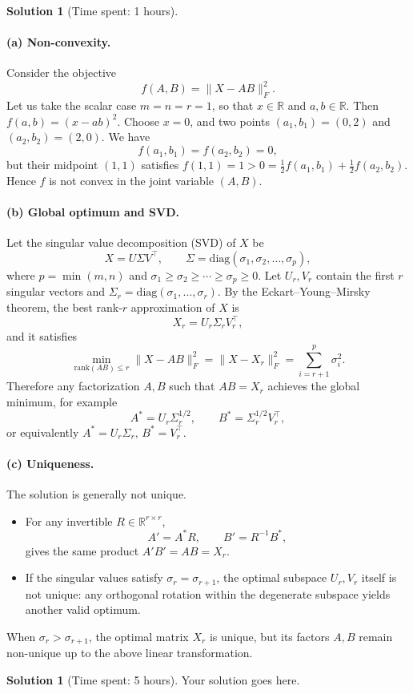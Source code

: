 \documentclass[11pt, reqno, letterpaper, twoside]{amsart}
\theoremstyle{plain}
\theoremstyle{definition}
\newtheorem{solution}[theorem]{Solution}
\begin{document}
\clearpage

\begin{solution}[Time spent: 1 hours]
\paragraph{(a) Non-convexity.}
Consider the objective
\[
f(A,B) = \|X - AB\|_F^2.
\]
Let us take the scalar case \(m = n = r = 1\), so that \(x \in \mathbb{R}\) and \(a,b \in \mathbb{R}\).
Then \(f(a,b) = (x - ab)^2.\)
Choose \(x = 0\), and two points \((a_1,b_1)=(0,2)\) and \((a_2,b_2)=(2,0)\).
We have
\[
f(a_1,b_1)=f(a_2,b_2)=0,
\]
but their midpoint \((1,1)\) satisfies \(f(1,1)=1 > 0 = \tfrac12 f(a_1,b_1) + \tfrac12 f(a_2,b_2)\).
Hence \(f\) is not convex in the joint variable \((A,B)\).

\paragraph{(b) Global optimum and SVD.}
Let the singular value decomposition (SVD) of \(X\) be
\[
X = U \Sigma V^\top, \qquad \Sigma = \mathrm{diag}(\sigma_1, \sigma_2, \ldots, \sigma_p),
\]
where \(p = \min(m,n)\) and \(\sigma_1 \ge \sigma_2 \ge \cdots \ge \sigma_p \ge 0.\)
Let \(U_r, V_r\) contain the first \(r\) singular vectors and
\(\Sigma_r = \mathrm{diag}(\sigma_1, \ldots, \sigma_r)\).
By the Eckart--Young--Mirsky theorem, the best rank-\(r\) approximation of \(X\) is
\[
X_r = U_r \Sigma_r V_r^\top,
\]
and it satisfies
\[
\min_{\mathrm{rank}(AB)\le r} \|X - AB\|_F^2
= \|X - X_r\|_F^2
= \sum_{i=r+1}^{p} \sigma_i^2.
\]
Therefore any factorization \(A,B\) such that \(AB = X_r\) achieves the global minimum,
for example
\[
A^{\ast} = U_r \Sigma_r^{1/2}, \qquad B^{\ast} = \Sigma_r^{1/2} V_r^\top,
\]
or equivalently \(A^{\ast} = U_r \Sigma_r, \, B^{\ast} = V_r^\top.\)

\paragraph{(c) Uniqueness.}
The solution is generally not unique.
\begin{itemize}
  \item For any invertible \(R \in \mathbb{R}^{r\times r}\),
  \[
  A' = A^{\ast} R, \qquad B' = R^{-1} B^{\ast},
  \]
  gives the same product \(A'B' = AB = X_r.\)
  \item If the singular values satisfy \(\sigma_r = \sigma_{r+1}\),
  the optimal subspace \(U_r,V_r\) itself is not unique:
  any orthogonal rotation within the degenerate subspace yields another valid optimum.
\end{itemize}
When \(\sigma_r > \sigma_{r+1}\), the optimal matrix \(X_r\) is unique,
but its factors \(A,B\) remain non-unique up to the above linear transformation.
\end{solution}

\clearpage




\begin{solution}[Time spent: 5 hours]
Your solution goes here.\\
\end{solution}
\end{document}

